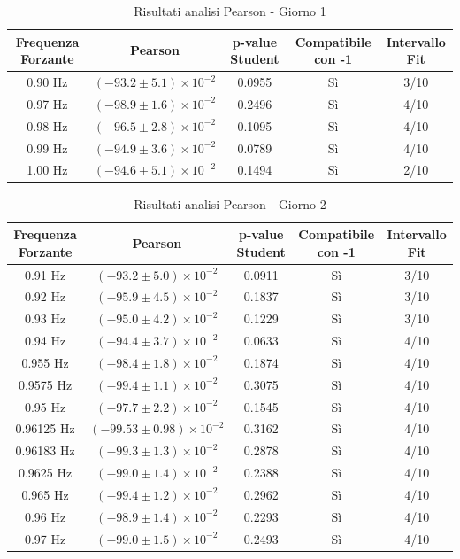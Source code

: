 \documentclass{article}
\begin{document}
\begin{table}[h]
\centering
\begin{tabular}{|c|c|c|c|c|}
\hline
\textbf{Frequenza Forzante} & \textbf{Pearson} & \textbf{p-value Student} & \textbf{Compatibile con -1} & \textbf{Intervallo Fit} \\
\hline
0.90 Hz & $(-93.2 \pm 5.1) \times 10^{-2}$ & 0.0955 & Sì & 3/10 \\
\hline
0.97 Hz & $(-98.9 \pm 1.6) \times 10^{-2}$ & 0.2496 & Sì & 4/10 \\
\hline
0.98 Hz & $(-96.5 \pm 2.8) \times 10^{-2}$ & 0.1095 & Sì & 4/10 \\
\hline
0.99 Hz & $(-94.9 \pm 3.6) \times 10^{-2}$ & 0.0789 & Sì & 4/10 \\
\hline
1.00 Hz & $(-94.6 \pm 5.1) \times 10^{-2}$ & 0.1494 & Sì & 2/10 \\
\hline
\end{tabular}
\caption{Risultati analisi Pearson - Giorno 1}
\label{tab:pearson_giorno1}
\end{table}


\begin{table}[h]
\centering
\begin{tabular}{|c|c|c|c|c|}
\hline
\textbf{Frequenza Forzante} & \textbf{Pearson} & \textbf{p-value Student} & \textbf{Compatibile con -1} & \textbf{Intervallo Fit} \\
\hline
0.91 Hz & $(-93.2 \pm 5.0) \times 10^{-2}$ & 0.0911 & Sì & 3/10 \\
\hline
0.92 Hz & $(-95.9 \pm 4.5) \times 10^{-2}$ & 0.1837 & Sì & 3/10 \\
\hline
0.93 Hz & $(-95.0 \pm 4.2) \times 10^{-2}$ & 0.1229 & Sì & 3/10 \\
\hline
0.94 Hz & $(-94.4 \pm 3.7) \times 10^{-2}$ & 0.0633 & Sì & 4/10 \\
\hline
0.955 Hz & $(-98.4 \pm 1.8) \times 10^{-2}$ & 0.1874 & Sì & 4/10 \\
\hline
0.9575 Hz & $(-99.4 \pm 1.1) \times 10^{-2}$ & 0.3075 & Sì & 4/10 \\
\hline
0.95 Hz & $(-97.7 \pm 2.2) \times 10^{-2}$ & 0.1545 & Sì & 4/10 \\
\hline
0.96125 Hz & $(-99.53 \pm 0.98) \times 10^{-2}$ & 0.3162 & Sì & 4/10 \\
\hline
0.96183 Hz & $(-99.3 \pm 1.3) \times 10^{-2}$ & 0.2878 & Sì & 4/10 \\
\hline
0.9625 Hz & $(-99.0 \pm 1.4) \times 10^{-2}$ & 0.2388 & Sì & 4/10 \\
\hline
0.965 Hz & $(-99.4 \pm 1.2) \times 10^{-2}$ & 0.2962 & Sì & 4/10 \\
\hline
0.96 Hz & $(-98.9 \pm 1.4) \times 10^{-2}$ & 0.2293 & Sì & 4/10 \\
\hline
0.97 Hz & $(-99.0 \pm 1.5) \times 10^{-2}$ & 0.2493 & Sì & 4/10 \\
\hline
\end{tabular}
\caption{Risultati analisi Pearson - Giorno 2}
\label{tab:pearson_giorno2}
\end{table}
\end{document}
